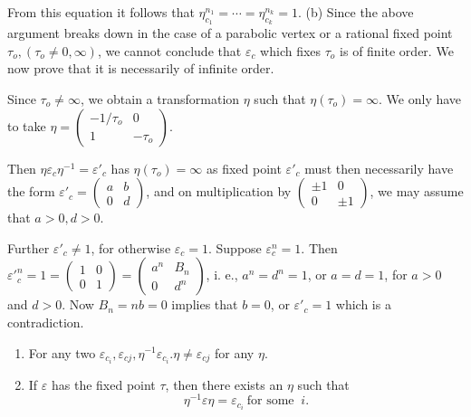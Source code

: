 From this equation it follows that $\eta _{c_1}^{n_1} = \cdots = \eta
_{c_k}^{n_k} = 1$. (b) Since the above argument breaks down in
the case of a parabolic vertex or a rational fixed point $\tau_o,
(\tau_o \neq 0,  \infty)$, we cannot conclude that $\varepsilon_c$
which fixes $\tau_o$ is of finite order. We now prove that it is
necessarily of infinite order.  

Since $\tau_o \neq \infty $, we obtain a transformation $\eta$ such
that $\eta (\tau_o) = \infty$. We only have to take $\eta
= \begin{pmatrix} -1 / \tau_o & 0 \\ 1 & -\tau_o \end{pmatrix}$.  

Then $\eta \varepsilon_c \eta^{-1} = \varepsilon'_c$ has $\eta
(\tau_o) = \infty$ as fixed point $\varepsilon'_c$ must then
necessarily have the form $\varepsilon'_c = \begin{pmatrix} a & b \\ 0
  & d \end{pmatrix}$, and on multiplication by $\begin{pmatrix} \pm 1
  & 0 \\ 0 & \pm 1 \end{pmatrix}$, we may assume that $a > 0,  d > 0$.  

Further $\varepsilon'_c \neq 1$, for otherwise $\varepsilon_c =
1$. Suppose $\varepsilon_c ^n = 1$. Then $\varepsilon'^{n}_{c} =
1= \begin{pmatrix}1 & 0 \\ 0 & 1 \end{pmatrix} = \begin{pmatrix}a^n &
  B_n \\ 0 & d^n \end{pmatrix}$, i. e.,  $a^n = d^n = 1$, or $a= d=
1$, for $a> 0$ and $d > 0$. Now $B_n = nb = 0$ implies that $b= 0$, or
$\varepsilon'_c = 1$ which is a contradiction.  

\begin{theorem}\label{chap2:sec5:thm3} %
  \begin{enumerate}[\rm (1)]
  \item For any two $ \varepsilon_{c_i}, \varepsilon_{cj},
    \eta^{-1} \varepsilon_{c_i}.\eta \neq \varepsilon_{cj}$ for any
    $\eta$.  
  \item If $\varepsilon$ has the fixed point $\tau$, then there
    exists an $\eta $ such that  
    $$
    \eta^{-1} \varepsilon \eta = \varepsilon_{c_i} ~\text{for some }~ i. 
    $$
  \end{enumerate}
\end{theorem}

